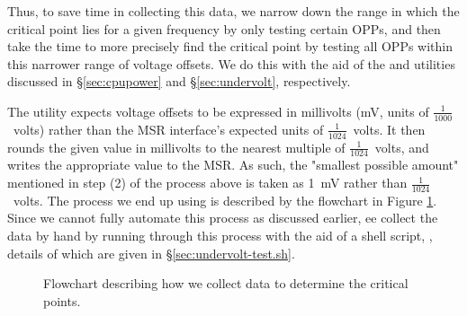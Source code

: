Thus, to save time in collecting this data, we narrow down the range in which
the critical point lies for a given frequency by only testing certain OPPs, and
then take the time to more precisely find the critical point by testing all OPPs
within this narrower range of voltage offsets. We do this with the aid of the
 and  utilities discussed in §\ref{sec:cpupower}
and §\ref{sec:undervolt}, respectively.

The  utility expects voltage offsets to be expressed in
millivolts (mV, units of $\frac{1}{1000}$~volts) rather than the MSR interface's
expected units of $\frac{1}{1024}$~volts. It then rounds the given value in
millivolts to the nearest multiple of $\frac{1}{1024}$~volts, and writes the
appropriate value to the MSR. As such, the "smallest possible amount" mentioned
in step (2) of the process above is taken as 1~mV rather than
$\frac{1}{1024}$~volts. The process we end up using is described by the
flowchart in Figure \ref{fig:data-collection-flowchart}. Since we cannot fully
automate this process as discussed earlier, ee collect the data by hand by
running through this process with the aid of a shell script,
, details of which are given in
§\ref{sec:undervolt-test.sh}.

\begin{figure}[!htb]
    \caption{
        \label{fig:data-collection-flowchart}
        Flowchart describing how we collect data to determine the critical
        points.
    }
\end{figure}

